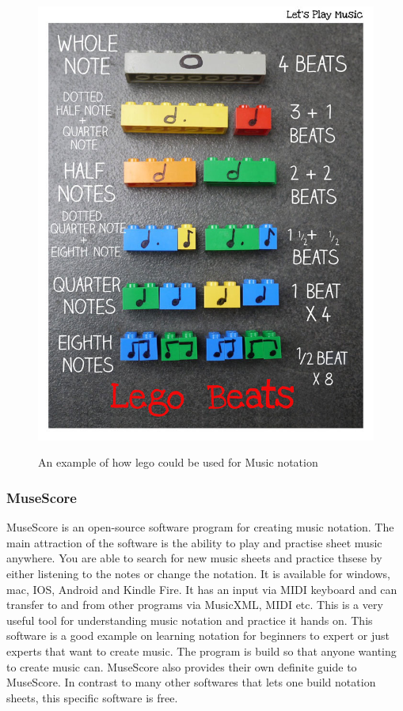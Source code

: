 \begin{figure}[H]
	\centering
	\includegraphics[width=0.7\linewidth]{figure/Analysis/lego}
	\label{fig:lego}
	\caption{An example of how lego could be used for Music notation}
\end{figure}

\subsubsection{MuseScore}
MuseScore is an open-source software program for creating music notation. The main attraction of the software is the ability to play and practise sheet music anywhere. You are able to search for new music sheets and practice thsese by either listening to the notes or change the notation. It is available for windows, mac, IOS, Android and Kindle Fire. It has an input via MIDI keyboard and can transfer to and from other programs via MusicXML, MIDI etc. This is a very useful tool for understanding music notation and practice it hands on. This software is a good example on learning notation for beginners to expert or just experts that want to create music. The program is build so that anyone wanting to create music can. MuseScore also provides their own definite guide to MuseScore. In contrast to many other softwares that lets one build notation sheets, this specific software is free. 

